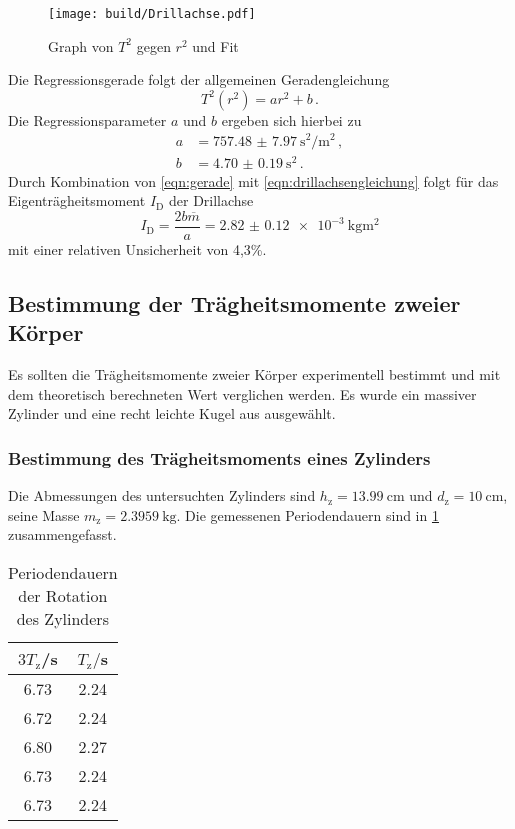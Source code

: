 \begin{figure}[H]
  \centering
  \texttt{[image: build/Drillachse.pdf]}
  \caption{Graph von $T^2$ gegen $r^2$ und Fit}
  \label{fig:drillachse}
\end{figure}

Die Regressionsgerade folgt der allgemeinen Geradengleichung
\begin{equation}
  T^2(r^2) = ar^2+b\,.
  \label{eqn:gerade}
\end{equation}
Die Regressionsparameter $a$ und $b$ ergeben sich hierbei zu
\begin{align}
  a &= \SI{757.48(797)}{\second\squared/\meter\squared}\,,\\
  b &= \SI{4.70(019)}{\second\squared}\,.
\end{align}
Durch Kombination von \eqref{eqn:gerade} mit \eqref{eqn:drillachsengleichung}
folgt für das Eigenträgheitsmoment $I_{\text{D}}$ der Drillachse
\begin{equation}
  I_{\text{D}} = \frac{2b\overline{m}}{a} = \SI{2.82(012)e-3}{\kilogram\meter\squared}
\end{equation}
mit einer relativen Unsicherheit von 4,3\%.
\subsection{Bestimmung der Trägheitsmomente zweier Körper}
Es sollten die Trägheitsmomente zweier Körper experimentell bestimmt und mit dem
theoretisch berechneten Wert verglichen werden. Es wurde ein massiver Zylinder
und eine recht leichte Kugel aus ausgewählt.
\subsubsection{Bestimmung des Trägheitsmoments eines Zylinders}
Die Abmessungen des untersuchten Zylinders sind $h_{\text{z}}=\SI{13.99}{\cm}$ und
$d_{\text{z}}=\SI{10}{\cm}$, seine Masse $m_{\text{z}}=\SI{2.3959}{\kilogram}$.
Die gemessenen Periodendauern sind in \ref{tab:zylinder} zusammengefasst.

\begin{table}[H]
\centering
\caption{Periodendauern der Rotation des Zylinders}
\label{tab:zylinder}
\begin{tabular}{c c}
\toprule
$3T_{\text{z}}$/s & $T_{\text{z}}/$s \\
\midrule
6.73 & 2.24 \\
6.72 & 2.24 \\
6.80 & 2.27 \\
6.73 & 2.24 \\
6.73 & 2.24 \\
\bottomrule
\end{tabular}
\end{table}


